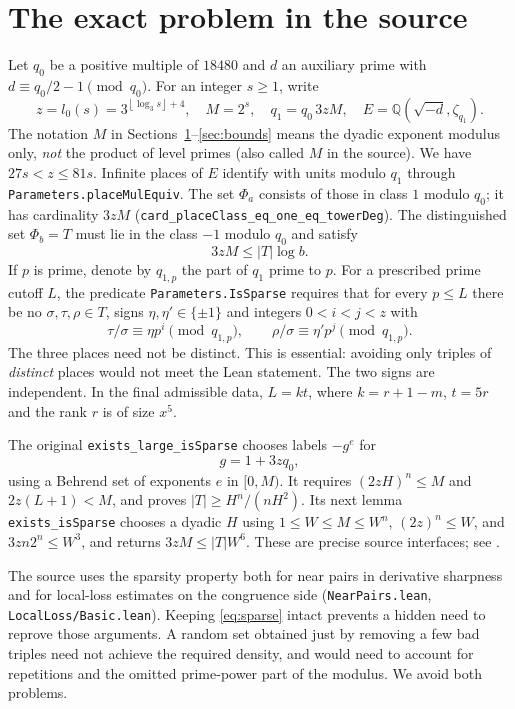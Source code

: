 \documentclass[11pt]{article}
\theoremstyle{remark}\newtheorem{remark}[theorem]{Remark}
\newcommand{\floor}[1]{\left\lfloor #1\right\rfloor}
\newcommand{\src}[1]{\texttt{#1}}
\begin{document}
\section{The exact problem in the source}\label{sec:setup}
Let $q_0$ be a positive multiple of $18480$ and $d$ an auxiliary prime with $d\equiv q_0/2-1\pmod{q_0}$. For an integer $s\ge1$, write
\[
 z=l_0(s)=3^{\floor{\log_3s}+4},\quad M=2^s,\quad
 q_1=q_0\,3zM,\quad E=\mathbb Q(\sqrt{-d},\zeta_{q_1}).
\]
The notation $M$ in Sections~\ref{sec:setup}--\ref{sec:bounds} means the dyadic exponent modulus only, \emph{not} the product of level primes (also called $M$ in the source). We have $27s<z\le81s$. Infinite places of $E$ identify with units modulo $q_1$ through \src{Parameters.placeMulEquiv}. The set $\Phi_a$ consists of those in class $1$ modulo $q_0$; it has cardinality $3zM$ (\src{card\_placeClass\_eq\_one\_eq\_towerDeg}). The distinguished set $\Phi_b=T$ must lie in the class $-1$ modulo $q_0$ and satisfy
\begin{equation}\label{eq:density}
 3zM\le |T|\log b.
\end{equation}
If $p$ is prime, denote by $q_{1,p}$ the part of $q_1$ prime to $p$. For a prescribed prime cutoff $L$, the predicate \src{Parameters.IsSparse} requires that for every $p\le L$ there be no $\sigma,\tau,\rho\in T$, signs $\eta,\eta'\in\{\pm1\}$ and integers $0<i<j<z$ with
\begin{equation}\label{eq:sparse}
 \tau/\sigma\equiv \eta p^i\pmod{q_{1,p}},\qquad
 \rho/\sigma\equiv \eta' p^j\pmod{q_{1,p}}.
\end{equation}
The three places need not be distinct. This is essential: avoiding only triples of \emph{distinct} places would not meet the Lean statement. The two signs are independent. In the final admissible data, $L=kt$, where $k=r+1-m$, $t=5r$ and the rank $r$ is of size $x^5$.

The original \src{exists\_large\_isSparse} chooses labels $-g^e$ for
\[
 g=1+3zq_0,
\]
using a Behrend set of exponents $e$ in $[0,M)$. It requires $(2zH)^n\le M$ and $2z(L+1)<M$, and proves $|T|\ge H^n/(nH^2)$. Its next lemma \src{exists\_isSparse} chooses a dyadic $H$ using $1\le W\le M\le W^n$, $(2z)^n\le W$, and $3zn2^n\le W^3$, and returns $3zM\le |T|W^6$. These are precise source interfaces; see \cite{existence,admissible,fields}.

The source uses the sparsity property both for near pairs in derivative sharpness and for local-loss estimates on the congruence side (\src{NearPairs.lean}, \src{LocalLoss/Basic.lean}). Keeping \eqref{eq:sparse} intact prevents a hidden need to reprove those arguments. A random set obtained just by removing a few bad triples need not achieve the required density, and would need to account for repetitions and the omitted prime-power part of the modulus. We avoid both problems.
\end{document}
